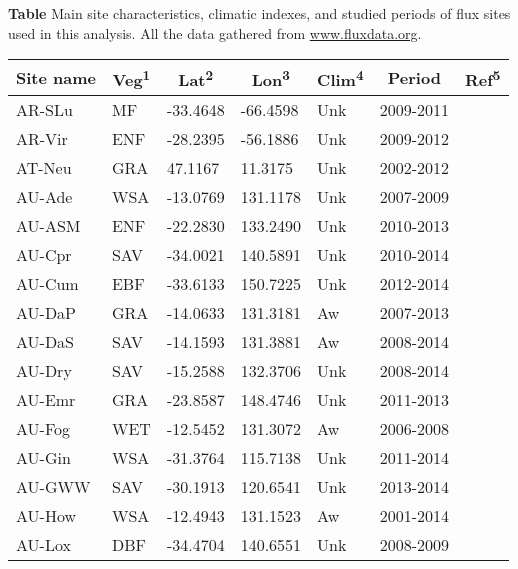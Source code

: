 \documentclass[a4paper, 12pt]{article}
\begin{document}
\setlength{\parindent}{0em}


\textbf{Table} Main site characteristics, climatic indexes, and studied periods of flux sites used in this analysis. All the data gathered from \href{www.fluxdata.org}{www.fluxdata.org}.

\begin{longtable}{l l l l l l l} %
\hline %
\multicolumn{1}{c}{\textbf{Site name}} & 
\multicolumn{1}{c}{\textbf{Veg\textsuperscript{1}}} & 
\multicolumn{1}{c}{\textbf{Lat\textsuperscript{2}}} & 
\multicolumn{1}{c}{\textbf{Lon\textsuperscript{3}}} & 
\multicolumn{1}{c}{\textbf{Clim\textsuperscript{4}}} & 
\multicolumn{1}{c}{\textbf{Period}} & 
\multicolumn{1}{l}{\textbf{Ref\textsuperscript{5}}} \\[0.5ex] %
\hline %
\endhead 
AR-SLu & MF & -33.4648 & -66.4598 & Unk & 2009-2011 & \cite{AR-SLu} \\
AR-Vir & ENF & -28.2395 & -56.1886 & Unk & 2009-2012 & \cite{AR-Vir} \\
AT-Neu & GRA & 47.1167 & 11.3175 & Unk & 2002-2012 & \cite{AT-Neu} \\
AU-Ade & WSA & -13.0769 & 131.1178 & Unk & 2007-2009 & \cite{AU-Ade} \\
AU-ASM & ENF & -22.2830 & 133.2490 & Unk & 2010-2013 & \cite{AU-ASM} \\
AU-Cpr & SAV & -34.0021 & 140.5891 & Unk & 2010-2014 & \cite{AU-Cpr} \\
AU-Cum & EBF & -33.6133 & 150.7225 & Unk & 2012-2014 & \cite{AU-Cum} \\
AU-DaP & GRA & -14.0633 & 131.3181 & Aw  & 2007-2013 & \cite{AU-DaP} \\
AU-DaS & SAV & -14.1593 & 131.3881 & Aw  & 2008-2014 & \cite{AU-DaS} \\
AU-Dry & SAV & -15.2588 & 132.3706 & Unk & 2008-2014 & \cite{AU-Dry} \\
AU-Emr & GRA & -23.8587 & 148.4746 & Unk & 2011-2013 & \cite{AU-Emr} \\
AU-Fog & WET & -12.5452 & 131.3072 & Aw  & 2006-2008 & \cite{AU-Fog} \\
AU-Gin & WSA & -31.3764 & 115.7138 & Unk & 2011-2014 & \cite{AU-Gin} \\
AU-GWW & SAV & -30.1913 & 120.6541 & Unk & 2013-2014 & \cite{AU-GWW} \\
AU-How & WSA & -12.4943 & 131.1523 & Aw  & 2001-2014 & \cite{AU-How} \\
AU-Lox & DBF & -34.4704 & 140.6551 & Unk & 2008-2009 & \cite{AU-Lox} \\

\end{longtable}
\end{document}
